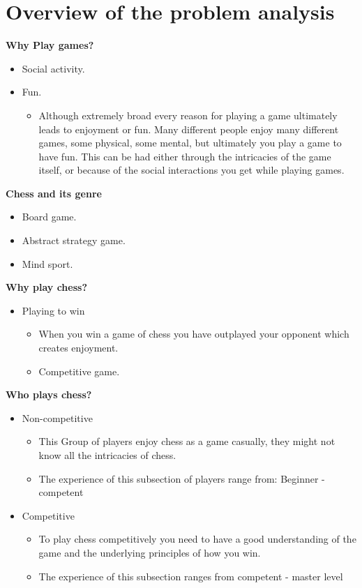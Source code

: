 \section{Overview of the problem analysis}\label{sec:overview}

\textbf{Why Play games?}

\begin{itemize}
    \item Social activity.
    \item Fun.
    \begin{itemize}
        \item Although extremely broad every reason for playing a game ultimately leads to enjoyment or fun.
        Many different people enjoy many different games, some physical, some mental,
        but ultimately you play a game to have fun.
        This can be had either through the intricacies of the game itself,
        or because of the social interactions you get while playing games.
    \end{itemize}
\end{itemize}

\textbf{Chess and its genre}

\begin{itemize}
    \item Board game.
    \item Abstract strategy game.
    \item Mind sport.
\end{itemize}

\textbf{Why play chess?}

\begin{itemize}
    \item Playing to win
    \begin{itemize}
        \item When you win a game of chess you have outplayed
        your opponent which creates enjoyment.
        \item Competitive game.
    \end{itemize}
\end{itemize}

\textbf{Who plays chess?}

\begin{itemize}
    \item Non-competitive
    \begin{itemize}
        \item This Group of players enjoy chess as a game casually,
        they might not know all the intricacies of chess.
        \item The experience of this subsection of players range from: Beginner - competent
    \end{itemize}
    \item Competitive
    \begin{itemize}
        \item To play chess competitively you need to have a good understanding
        of the game and the underlying principles of how you win.
        \item The experience of this subsection ranges from competent - master level
    \end{itemize}
\end{itemize}

